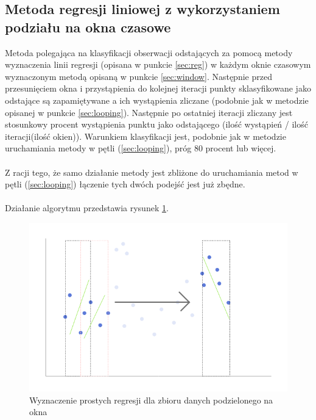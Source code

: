 \documentclass[eng,printmode]{mgr}
\begin{document}
\subsection{Metoda regresji liniowej z wykorzystaniem podziału na okna czasowe}
Metoda polegająca na klasyfikacji obserwacji odstających za pomocą metody wyznaczenia linii regresji (opisana w punkcie \ref{sec:reg}) w każdym oknie czasowym wyznaczonym metodą opisaną w punkcie \ref{sec:window}. Następnie przed przesunięciem okna i przystąpienia do kolejnej iteracji punkty sklasyfikowane jako odstające są zapamiętywane a ich wystąpienia zliczane (podobnie jak w metodzie opisanej w punkcie \ref{sec:looping}). Następnie po ostatniej iteracji zliczany jest stosunkowy procent wystąpienia punktu jako odstającego (ilość wystąpień / ilość iteracji(ilość okien)). Warunkiem klasyfikacji jest, podobnie jak w metodzie uruchamiania metody w pętli (\ref{sec:looping}), próg 80 procent lub więcej. \\\\
Z racji tego, że samo działanie metody jest zbliżone do uruchamiania metod w pętli (\ref{sec:looping}) łączenie tych dwóch podejść jest już zbędne.
\\\\
Działanie algorytmu przedstawia rysunek \ref{fig:reg_windowed}.
\begin{figure}[H]
  \begin{center}
  \includegraphics[scale=0.7]{reg_windowed}
  \end{center}
  \caption{Wyznaczenie prostych regresji dla zbioru danych podzielonego na okna}
  \label{fig:reg_windowed}
\end{figure}
\end{document}
